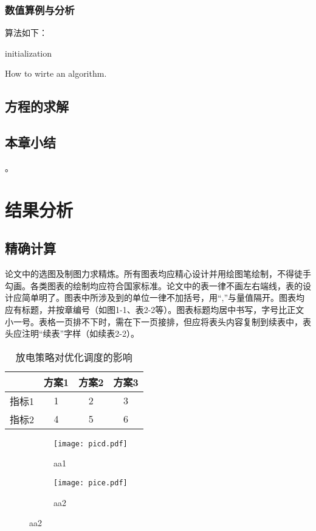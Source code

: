 \documentclass[bachelor]{NCEPU-thesis}
\begin{document}
\subsection{数值算例与分析}
算法如下：

\begin{algorithm}[H]
 initialization\;
 \caption{How to wirte an algorithm.}
\end{algorithm}


\section{方程的求解}

\section{本章小结}
。\chapter{结果分析}
\section{精确计算}

论文中的选图及制图力求精炼。所有图表均应精心设计并用绘图笔绘制，不得徒手勾画。各类图表的绘制均应符合国家标准。论文中的表一律不画左右端线，表的设计应简单明了。图表中所涉及到的单位一律不加括号，用“,”与量值隔开。图表均应有标题，并按章编号（如图1-1、表2-2等）。图表标题均居中书写，字号比正文小一号。表格一页排不下时，需在下一页接排，但应将表头内容复制到续表中，表头应注明“续表”字样（如续表2-2）。
\begin{table}[h]
\caption{放电策略对优化调度的影响}
\begin{tabular}{cccc}
    \toprule
          & 方案1   & 方案2   & 方案3 \\
    \midrule
    指标1   & 1     & 2     & 3 \\
    指标2   & 4     & 5     & 6 \\
    \bottomrule
    \end{tabular}%
\label{tablea}
\end{table}

\begin{figure}[h]
\begin{subfigure}[b]{0.5\linewidth}
\label{picd}
\texttt{[image: picd.pdf]}
\caption{aa1}
\end{subfigure}
\begin{subfigure}[b]{0.5\linewidth}
\label{pice}
\texttt{[image: pice.pdf]}
\caption{aa2}
\end{subfigure}
\label{fig2}
\end{figure}
\end{document}
